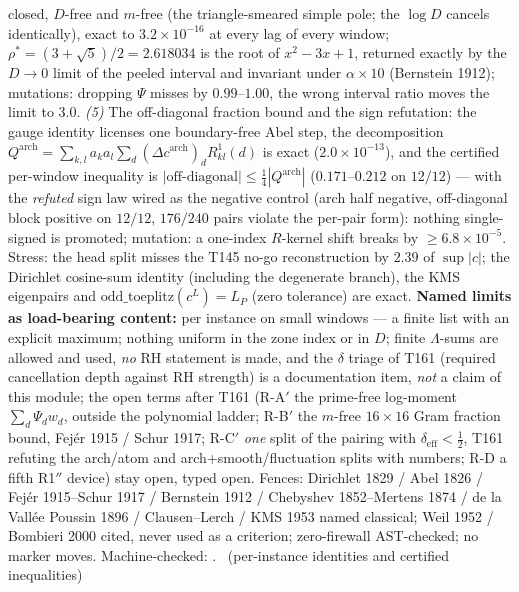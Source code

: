 \documentclass[11pt,a4paper]{article}
\begin{document}
closed, $D$-free and $m$-free (the triangle-smeared simple pole; the
$\log D$ cancels identically), exact to $3.2\times10^{-16}$ at every
lag of every window; $\rho^*=(3+\sqrt5)/2=2.618034$ is the root of
$x^2-3x+1$, returned exactly by the $D\to0$ limit of the peeled
interval and invariant under $\alpha\times10$ (Bernstein 1912);
mutations: dropping $\Psi$ misses by $0.99$--$1.00$, the wrong interval
ratio moves the limit to $3.0$. \emph{(5)} The off-diagonal fraction
bound and the sign refutation: the gauge identity licenses one
boundary-free Abel step, the decomposition
$Q^{\mathrm{arch}}=\sum_{k,l}a_ka_l\sum_d(\Delta c^{\mathrm{arch}})_d
R^1_{kl}(d)$ is exact ($2.0\times10^{-13}$), and the certified
per-window inequality is $|\text{off-diagonal}|\le\tfrac14
|Q^{\mathrm{arch}}|$ ($0.171$--$0.212$ on $12/12$) --- with the
\emph{refuted} sign law wired as the negative control (arch half
negative, off-diagonal block positive on $12/12$, $176/240$ pairs
violate the per-pair form): nothing single-signed is promoted;
mutation: a one-index $R$-kernel shift breaks by
$\ge6.8\times10^{-5}$. Stress: the head split misses the T145 no-go
reconstruction by $2.39$ of $\sup|c|$; the Dirichlet cosine-sum
identity (including the degenerate branch), the KMS eigenpairs and
$\mathrm{odd\_toeplitz}(c^L)=L_P$ (zero tolerance) are exact.
\textbf{Named limits as load-bearing content:} per instance on small
windows --- a finite list with an explicit maximum; nothing uniform in
the zone index or in $D$; finite $\Lambda$-sums are allowed and used,
\emph{no} RH statement is made, and the $\delta$ triage of T161
(required cancellation depth against RH strength) is a documentation
item, \emph{not} a claim of this module; the open terms after T161
(R-A$'$ the prime-free log-moment $\sum_d\Psi_dw_d$, outside the
polynomial ladder; R-B$'$ the $m$-free $16\times16$ Gram fraction
bound, Fej\'er 1915 / Schur 1917; R-C$'$ \emph{one} split of the
pairing with $\delta_{\mathrm{eff}}<\tfrac12$, T161 refuting the
arch/atom and arch+smooth/fluctuation splits with numbers; R-D a fifth
R1$''$ device) stay open, typed open. Fences: Dirichlet 1829 / Abel
1826 / Fej\'er 1915--Schur 1917 / Bernstein 1912 / Chebyshev
1852--Mertens 1874 / de la Vall\'ee Poussin 1896 / Clausen--Lerch / KMS
1953 named classical; Weil 1952 / Bombieri 2000 cited, never used as a
criterion; zero-firewall AST-checked; no marker moves.
Machine-checked: .
\mE\ (per-instance identities and certified inequalities)
\end{document}
